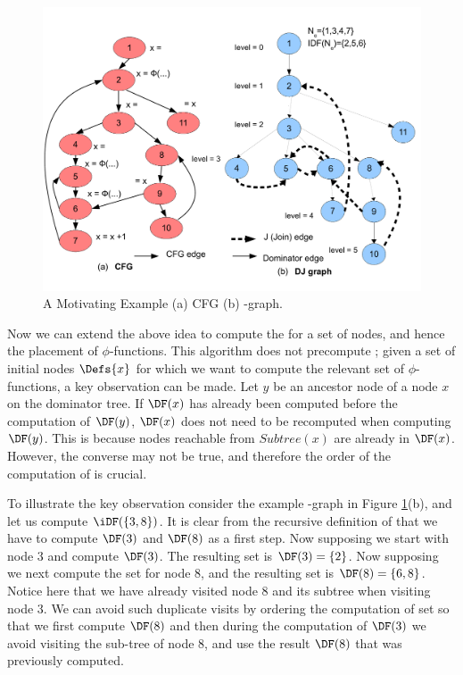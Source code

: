 {    \begin{figure}[htb]
    \centerline{\includegraphics[scale=0.4]{cfglive_new.pdf}}
    \caption{A Motivating Example (a) CFG (b) \DJ-graph.}
    \label{fig:cfg}
    \end{figure} 

Now we can extend the above idea to compute the \iDF for a set of nodes, and 
hence the placement of $\phi$-functions. This algorithm does not precompute \DF; given a set of initial nodes $\Defs{x}$ for which we want to compute the relevant set of $\phi$-functions,
a key observation can be made. Let $y$ be an ancestor node of a node $x$ on the 
dominator tree. If $\DF(x)$ has already been computed before the computation of 
$\DF(y)$,  $\DF(x)$ does not need to
be recomputed when computing $\DF(y)$. This is because nodes reachable from 
$\textit{Subtree}(x)$ are already in $\DF(x)$. However, the converse may not be true, and  therefore the order of the computation of \DF is crucial.

To illustrate the key observation consider the example \DJ-graph in Figure \ref{fig:cfg}(b),
and let us compute $\iDF(\{3,8\})$. It is clear from the recursive definition of \iDF that we have to compute $\DF(3)$ and $\DF(8)$ as a first step. Now supposing we start with node $3$ and compute $\DF(3)$. The resulting \DF set is $\DF(3) = \{2\}$. 
Now supposing we next compute the \DF set for node $8$, and the resulting set 
is $\DF(8) = \{6,8\}$. Notice here that we have already visited node $8$ and 
its subtree when visiting node $3$. We can avoid such duplicate visits by ordering the computation of \DF set so that we first compute $\DF(8)$ and then during the computation of $\DF(3)$ we avoid visiting the sub-tree of node $8$, and use the result $\DF(8)$ that was previously computed. 

}
